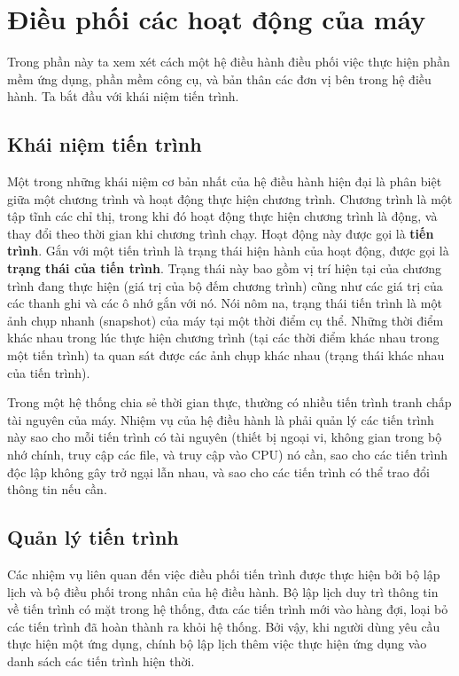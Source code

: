 \section{Điều phối các hoạt động của máy}

Trong phần này ta xem xét cách một hệ điều hành điều phối việc thực hiện phần mềm ứng
dụng, phần mềm công cụ, và bản thân các đơn vị bên trong hệ điều hành. Ta bắt đầu với khái
niệm tiến trình.

\subsection*{Khái niệm tiến trình}
Một trong những khái niệm cơ bản nhất của hệ điều hành hiện đại là phân biệt giữa một
chương trình và hoạt động thực hiện chương trình. Chương trình là một tập tĩnh các chỉ
thị, trong khi đó hoạt động thực hiện chương trình là động, và thay đổi theo thời gian khi
chương trình chạy. Hoạt động này được gọi là \textbf{tiến trình}. Gắn với một tiến trình
là trạng thái hiện hành của hoạt động, được gọi là \textbf{trạng thái của tiến
  trình}. Trạng thái này bao gồm vị trí hiện tại của chương trình đang thực hiện (giá trị
của bộ đếm chương trình) cũng như các giá trị của các thanh ghi và các ô nhớ gắn với
nó. Nói nôm na, trạng thái tiến trình là một ảnh chụp nhanh (snapshot) của máy tại một
thời điểm cụ thể. Những thời điểm khác nhau trong lúc thực hiện chương trình (tại các thời
điểm khác nhau trong một tiến trình) ta quan sát được các ảnh chụp khác nhau (trạng thái
khác nhau của tiến trình).


Trong một hệ thống chia sẻ thời gian thực, thường có nhiều tiến trình tranh chấp tài
nguyên của máy. Nhiệm vụ của hệ điều hành là phải quản lý các tiến trình này sao cho mỗi
tiến trình có tài nguyên (thiết bị ngoại vi, không gian trong bộ nhớ chính, truy cập các
file, và truy cập vào CPU) nó cần, sao cho các tiến trình độc lập không gây trở ngại lẫn
nhau, và sao cho các tiến trình có thể trao đổi thông tin nếu cần.

\subsection*{Quản lý tiến trình}

Các nhiệm vụ liên quan đến việc điều phối tiến trình được thực hiện bởi bộ lập lịch và bộ
điều phối trong nhân của hệ điều hành. Bộ lập lịch duy trì thông tin về tiến trình có mặt
trong hệ thống, đưa các tiến trình mới vào hàng đợi, loại bỏ các tiến trình đã hoàn thành
ra khỏi hệ thống. Bởi vậy, khi người dùng yêu cầu thực hiện một ứng dụng, chính bộ lập
lịch thêm việc thực hiện ứng dụng vào danh sách các tiến trình hiện thời.

